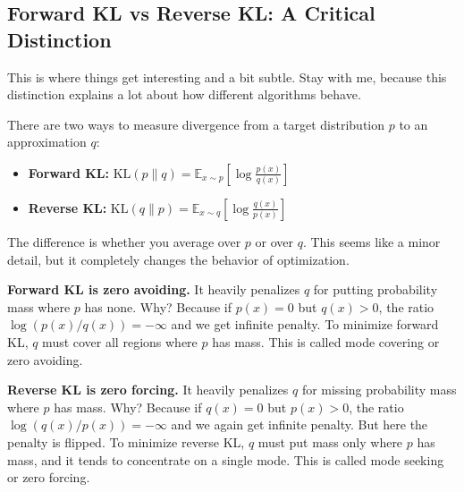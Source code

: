 \vspace{1.5em}

\subsection{Forward KL vs Reverse KL: A Critical Distinction}

This is where things get interesting and a bit subtle. Stay with me, because this distinction explains a lot about how different algorithms behave.

\vspace{1em}

There are two ways to measure divergence from a target distribution $p$ to an approximation $q$:

\begin{itemize}
\item \textbf{Forward KL:} $\text{KL}(p \| q) = \mathbb{E}_{x \sim p}\left[\log \frac{p(x)}{q(x)}\right]$

\item \textbf{Reverse KL:} $\text{KL}(q \| p) = \mathbb{E}_{x \sim q}\left[\log \frac{q(x)}{p(x)}\right]$
\end{itemize}

\vspace{1em}

The difference is whether you average over $p$ or over $q$. This seems like a minor detail, but it completely changes the behavior of optimization.

\vspace{1em}

\textbf{Forward KL is zero avoiding.} It heavily penalizes $q$ for putting probability mass where $p$ has none. Why? Because if $p(x) = 0$ but $q(x) > 0$, the ratio $\log(p(x)/q(x)) = -\infty$ and we get infinite penalty. To minimize forward KL, $q$ must cover all regions where $p$ has mass. This is called mode covering or zero avoiding.

\vspace{1em}

\textbf{Reverse KL is zero forcing.} It heavily penalizes $q$ for missing probability mass where $p$ has mass. Why? Because if $q(x) = 0$ but $p(x) > 0$, the ratio $\log(q(x)/p(x)) = -\infty$ and we again get infinite penalty. But here the penalty is flipped. To minimize reverse KL, $q$ must put mass only where $p$ has mass, and it tends to concentrate on a single mode. This is called mode seeking or zero forcing.

\vspace{2em}

